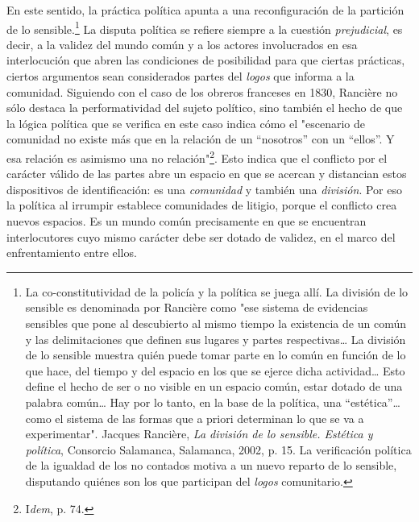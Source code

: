 \documentclass{book}
\begin{document}
En este sentido, la práctica política apunta a una reconfiguración de la
partición de lo sensible.\footnote{La co-constitutividad de la policía y
  la política se juega allí. La división de lo sensible es denominada
  por Rancière como "ese sistema de evidencias sensibles que pone al
  descubierto al mismo tiempo la existencia de un común y las
  delimitaciones que definen sus lugares y partes respectivas\ldots{} La
  división de lo sensible muestra quién puede tomar parte en lo común en
  función de lo que hace, del tiempo y del espacio en los que se ejerce
  dicha actividad\ldots{} Esto define el hecho de ser o no visible en un
  espacio común, estar dotado de una palabra común\ldots{} Hay por lo
  tanto, en la base de la política, una ``estética''\ldots{} como el
  sistema de las formas que a priori determinan lo que se va a
  experimentar". Jacques Rancière, \emph{La división de lo sensible.
  Estética y política}, Consorcio Salamanca, Salamanca, 2002, p. 15. La
  verificación política de la igualdad de los no contados motiva a un
  nuevo reparto de lo sensible, disputando quiénes son los que
  participan del \emph{logos} comunitario.} La disputa política se
refiere siempre a la cuestión \emph{prejudicial}, es decir, a la validez
del mundo común y a los actores involucrados en esa interlocución que
abren las condiciones de posibilidad para que ciertas prácticas, ciertos
argumentos sean considerados partes del \emph{logos} que informa a la
comunidad. Siguiendo con el caso de los obreros franceses en 1830,
Rancière no sólo destaca la performatividad del sujeto político, sino
también el hecho de que la lógica política que se verifica en este caso
indica cómo el "escenario de comunidad no existe más que en la relación
de un ``nosotros'' con un ``ellos''. Y esa relación es asimismo una no
relación"\footnote{I\emph{dem}, p. 74.}. Esto indica que el conflicto
por el carácter válido de las partes abre un espacio en que se acercan y
distancian estos dispositivos de identificación: es una \emph{comunidad}
y también una \emph{división}. Por eso la política al irrumpir establece
comunidades de litigio, porque el conflicto crea nuevos espacios. Es un
mundo común precisamente en que se encuentran interlocutores cuyo mismo
carácter debe ser dotado de validez, en el marco del enfrentamiento
entre ellos.
\end{document}
